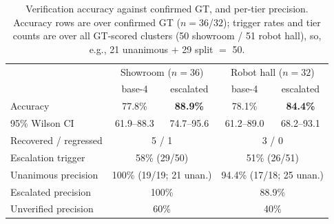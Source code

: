 \begin{table}[t]
\centering
\caption{Verification accuracy against confirmed GT, and per-tier precision.
Accuracy rows are over confirmed GT ($n{=}36$/$32$); trigger rates and tier
counts are over all GT-scored clusters (50 showroom / 51 robot hall), so,
e.g., 21 unanimous $+$ 29 split $=$ 50.}
\label{tab:verification}
\small
\begin{tabular}{@{}lcccc@{}}
\toprule
 & \multicolumn{2}{c}{Showroom ($n{=}36$)} & \multicolumn{2}{c}{Robot hall ($n{=}32$)} \\
 & base-4 & escalated & base-4 & escalated \\
\midrule
Accuracy & 77.8\% & \textbf{88.9\%} & 78.1\% & \textbf{84.4\%} \\
95\% Wilson CI & 61.9--88.3 & 74.7--95.6 & 61.2--89.0 & 68.2--93.1 \\
Recovered / regressed & \multicolumn{2}{c}{5 / 1} & \multicolumn{2}{c}{3 / 0} \\
Escalation trigger & \multicolumn{2}{c}{58\% (29/50)} & \multicolumn{2}{c}{51\% (26/51)} \\
\midrule
Unanimous precision & \multicolumn{2}{c}{100\% (19/19; 21 unan.)} & \multicolumn{2}{c}{94.4\% (17/18; 25 unan.)} \\
Escalated precision & \multicolumn{2}{c}{100\%} & \multicolumn{2}{c}{88.9\%} \\
Unverified precision & \multicolumn{2}{c}{60\%} & \multicolumn{2}{c}{40\%} \\
\bottomrule
\end{tabular}
\end{table}

